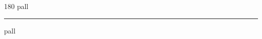 
\begin{frame}
\begin{center}
\begin{turn}{180}
{\fontsize{2.5cm}{1em}\selectfont pall}
\end{turn}
\vspace{1em}\par  
\hrule
\vspace{1em}\par  
{\fontsize{2.5cm}{1em}\selectfont pall}
\end{center}
\end{frame}
